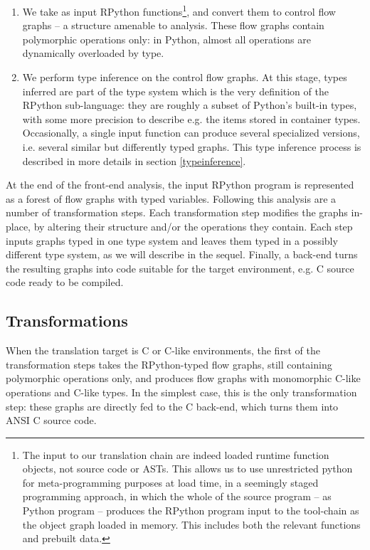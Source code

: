 \documentclass{acm_proc_article-sp}
\begin{document}
\begin{enumerate}
\item We take as input RPython functions\footnote{The input to our
       translation chain are indeed loaded runtime function objects,
       not source code or ASTs.  This allows us to use unrestricted
       python for meta-programming purposes at load time, in a
       seemingly staged programming approach, in which the whole of
       the source program -- as Python program -- produces the RPython
       program input to the tool-chain as the object graph loaded in
       memory.  This includes both the relevant functions and prebuilt
       data.}, and convert them to control flow graphs -- a structure
       amenable to analysis.  These flow graphs contain polymorphic
       operations only: in Python, almost all operations are
       dynamically overloaded by type.

\item We perform type inference on the control flow graphs.  At this
      stage, types inferred are part of the type system which is the
      very definition of the RPython sub-language: they are roughly a
      subset of Python's built-in types, with some more precision to
      describe e.g. the items stored in container types.
      Occasionally, a single input function can produce several
      specialized versions, i.e. several similar but differently typed
      graphs.  This type inference process is described in more
      details in section \ref{typeinference}.
\end{enumerate}
      
At the end of the front-end analysis, the input RPython program is
represented as a forest of flow graphs with typed variables.  Following
this analysis are a number of transformation steps.  Each transformation
step modifies the graphs in-place, by altering their structure and/or
the operations they contain.  Each step inputs graphs typed in one type
system and leaves them typed in a possibly different type system, as we
will describe in the sequel.  Finally, a back-end turns the resulting
graphs into code suitable for the target environment, e.g. C source code
ready to be compiled.


\subsection{Transformations}

When the translation target is C or C-like environments, the first of
the transformation steps takes the RPython-typed flow graphs, still
containing polymorphic operations only, and produces flow graphs with
monomorphic C-like operations and C-like types.  In the simplest case,
this is the only transformation step: these graphs are directly fed to
the C back-end, which turns them into ANSI C source code.
\end{document}
